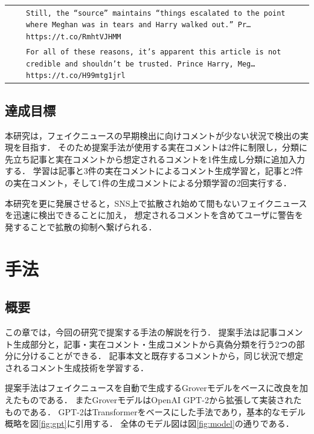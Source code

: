 \begin{landscape}
\begin{table}[p]
\begin{tabularx}{\linewidth}{llX}
                              &                             & \texttt{Still, the ``source'' maintains ``things escalated to the point where Meghan was in tears and Harry walked out.'' Pr… https://t.co/RmhtVJHMM}\\ \cline{3-3}
                              &                             & \texttt{For all of these reasons, it’s apparent this article is not credible and shouldn’t be trusted. Prince Harry, Meg… https://t.co/H99mtg1jrl}\\ \hline
    \end{tabularx}
\end{table} 
\end{landscape} 

\newpage
\subsection{達成目標}
本研究は，フェイクニュースの早期検出に向けコメントが少ない状況で検出の実現を目指す．
そのため提案手法が使用する実在コメントは2件に制限し，分類に先立ち記事と実在コメントから想定されるコメントを1件生成し分類に追加入力する．
学習は記事と3件の実在コメントによるコメント生成学習と，記事と2件の実在コメント，そして1件の生成コメントによる分類学習の2回実行する．

本研究を更に発展させると，SNS上で拡散され始めて間もないフェイクニュースを迅速に検出できることに加え，
想定されるコメントを含めてユーザに警告を発することで拡散の抑制へ繋げられる．

\section{手法}\label{cpt:gen_mtd}
\subsection{概要}
\label{sec:method_overall}
この章では，今回の研究で提案する手法の解説を行う．
提案手法は記事コメント生成部分と，記事・実在コメント・生成コメントから真偽分類を行う2つの部分に分けることができる．
記事本文と既存するコメントから，同じ状況で想定されるコメント生成技術を学習する．

提案手法はフェイクニュースを自動で生成するGroverモデルをベースに改良を加えたものである．
またGroverモデルはOpenAI GPT-2\cite{Radford_GPT2}から拡張して実装されたものである\cite{Shu:2017:FND:3137597.3137600}．
GPT-2はTransformerをベースにした手法であり，基本的なモデル概略を図\ref{fig:gpt}に引用する\cite{radford2018improving}．
全体のモデル図は図\ref{fig:model}の通りである．

